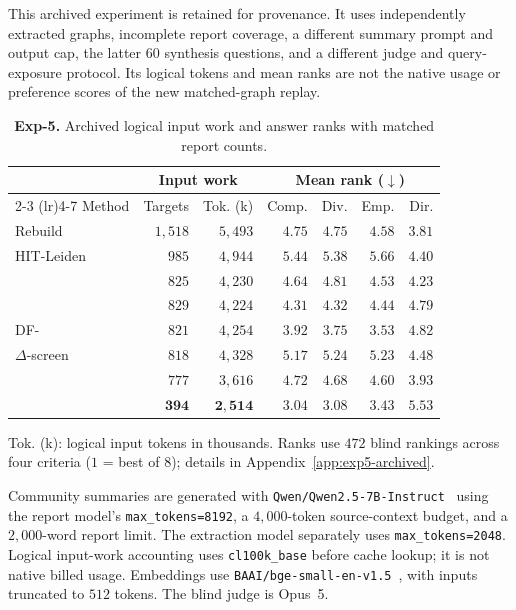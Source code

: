 This archived experiment is retained for provenance. It uses independently
extracted graphs, incomplete report coverage, a different summary prompt and
output cap, the latter $60$ synthesis questions, and a different judge and
query-exposure protocol. Its logical tokens and mean ranks are not the native
usage or preference scores of the new matched-graph replay.
\begin{table}[tb]\centering
\caption{\textbf{Exp-5.} Archived logical input work and answer ranks with matched report counts.}
\label{tab:arena-archived}
\footnotesize
\setlength{\tabcolsep}{0.20em}
\begin{tabular*}{\linewidth}{@{\extracolsep{\fill}}lrrrrrr@{}}
\toprule
& \multicolumn{2}{c}{Input work} & \multicolumn{4}{c}{Mean rank ($\downarrow$)} \\
\cmidrule(lr){2-3} \cmidrule(lr){4-7}
Method & Targets & Tok. (k) & Comp. & Div. & Emp. & Dir. \\
\midrule
Rebuild         & $1{,}518$ & $5{,}493$ & $4.75$ & $4.75$ & $4.58$ & $\mathbf{3.81}$ \\
HIT-Leiden      & $985$ & $4{,}944$ & $5.44$ & $5.38$ & $5.66$ & $4.40$ \\
\DynaMo{}       & $825$ & $4{,}230$ & $4.64$ & $4.81$ & $4.53$ & $4.23$ \\
\QCA{}          & $829$ & $4{,}224$ & $4.31$ & $4.32$ & $4.44$ & $4.79$ \\
DF-\Louvain{}   & $821$ & $4{,}254$ & $3.92$ & $3.75$ & $3.53$ & $4.82$ \\
$\Delta$-screen & $818$ & $4{,}328$ & $5.17$ & $5.24$ & $5.23$ & $4.48$ \\
\Batch{}        & $777$ & $3{,}616$ & $4.72$ & $4.68$ & $4.60$ & $3.93$ \\
\midrule
\DyLo{} & $\mathbf{394}$ & $\mathbf{2{,}514}$ & $\mathbf{3.04}$ & $\mathbf{3.08}$ & $\mathbf{3.43}$ & $5.53$ \\
\bottomrule
\end{tabular*}
\par\smallskip\raggedright
Tok. (k): logical input tokens in thousands. Ranks use $472$ blind
rankings across four criteria ($1$ = best of $8$); details in
Appendix~\ref{app:exp5-archived}.
\end{table}


 Community summaries are generated with
\texttt{Qwen/Qwen2.5-7B-Instruct}~\cite{yang2024qwen25} using the report
model's \texttt{max\_tokens=8192}, a $4{,}000$-token source-context budget,
and a $2{,}000$-word report limit. The extraction model separately uses
\texttt{max\_tokens=2048}. Logical input-work accounting uses
\texttt{cl100k\_base} before cache lookup; it is not native billed usage. Embeddings use
\texttt{BAAI/bge-small-en-v1.5}~\cite{xiao2024cpack}, with inputs truncated to $512$ tokens. The
blind judge is Opus~5.

